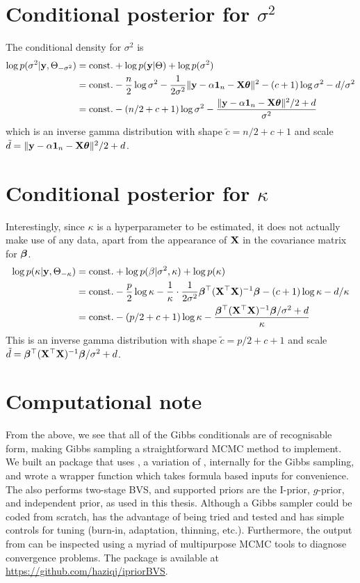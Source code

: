 \section{Conditional posterior for $\sigma^2$}

The conditional density for $\sigma^2$ is
\begin{align*}
  \log p(\sigma^2|\by,\Theta_{-\sigma^2}) 
  &= \const + \log p(\by|\Theta) + \log p(\sigma^2) \\
  &= \const - \half[n]\log\sigma^2 - \frac{1}{2\sigma^2} \Vert \by - \alpha \bone_n - \bX\btheta \Vert^2 - (c+1)\log\sigma^2 - d / \sigma^2 \\
  &= \const - (n/2 + c + 1)\log\sigma^2 - \frac{\Vert \by - \alpha \bone_n - \bX\btheta \Vert^2/2 + d}{\sigma^2}
\end{align*}
which is an inverse gamma distribution with shape $\tilde c = n/2 + c + 1$ and scale $\tilde d = \Vert \by - \alpha \bone_n - \bX\btheta \Vert^2/2 + d$.

\section{Conditional posterior for $\kappa$}

Interestingly, since $\kappa$ is a hyperparameter to be estimated, it does not actually make use of any data, apart from the appearance of $\bX$ in the covariance matrix for $\bbeta$.
\begin{align*}
  \log p(\kappa|\by,\Theta_{-\kappa}) &= \const + \log p(\beta|\sigma^2,\kappa) + \log p(\kappa) \\
  &= \const - \half[p]\log\kappa - \frac{1}{\kappa}\cdot\frac{1}{2\sigma^2} \bbeta^\top(\XTX)^{-1}\bbeta - (c+1)\log\kappa - d / \kappa \\
  &= \const - (p/2+c+1)\log\kappa - \frac{\bbeta^\top(\XTX)^{-1}\bbeta/\sigma^2+d}{\kappa}
\end{align*}
This is an inverse gamma distribution with shape $\tilde c = p/2 + c + 1$ and scale $\tilde d = \bbeta^\top(\XTX)^{-1}\bbeta/\sigma^2+d$.

\section{Computational note}

From the above, we see that all of the Gibbs conditionals are of recognisable form, making Gibbs sampling a straightforward MCMC method to implement.
We built an  package  that uses  \citep{plummer2003jags}, a variation of , internally for the Gibbs sampling, and wrote a wrapper function which takes formula based inputs for convenience.
The  also performs two-stage BVS, and supported priors are the I-prior, $g$-prior, and independent prior, as used in this thesis.
Although a Gibbs sampler could be coded from scratch,  has the advantage of being tried and tested and has simple controls for tuning (burn-in, adaptation, thinning, etc.).
Furthermore, the output from  can be inspected using a myriad of multipurpose MCMC tools to diagnose convergence problems.
The  package is available at \url{https://github.com/haziqj/ipriorBVS}.

